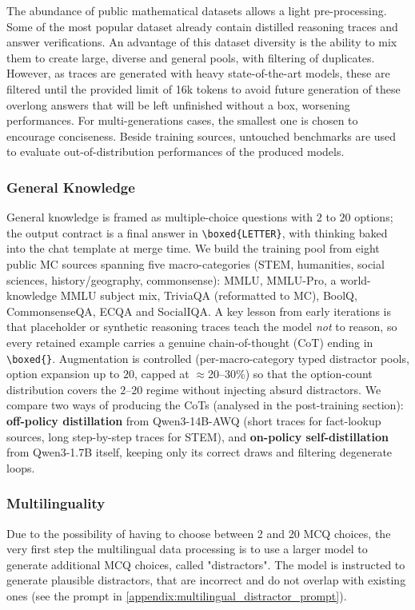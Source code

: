 \documentclass[11pt]{article}
\begin{document}
    The abundance of public mathematical datasets allows a light pre-processing. Some of the most popular dataset already contain distilled reasoning traces and answer verifications. An advantage of this dataset diversity is the ability to mix them to create large, diverse and general pools, with filtering of duplicates. However, as traces are generated with heavy state-of-the-art models, these are filtered until the provided limit of 16k tokens to avoid future generation of these overlong answers that will be left unfinished without a box, worsening performances. For multi-generations cases, the smallest one is chosen to encourage conciseness. Beside training sources, untouched benchmarks are used to evaluate out-of-distribution performances of the produced models. 

    
\subsubsection{General Knowledge}

    General knowledge is framed as multiple-choice questions with $2$ to $20$ options; the output contract is a final answer in \texttt{\textbackslash boxed\{LETTER\}}, with thinking baked into the chat template at merge time. We build the training pool from eight public MC sources spanning five macro-categories (STEM, humanities, social sciences, history/geography, commonsense): MMLU, MMLU-Pro, a world-knowledge MMLU subject mix, TriviaQA (reformatted to MC), BoolQ, CommonsenseQA, ECQA and SocialIQA. A key lesson from early iterations is that placeholder or synthetic reasoning traces teach the model \emph{not} to reason, so every retained example carries a genuine chain-of-thought (CoT) ending in \texttt{\textbackslash boxed\{\}}. Augmentation is controlled (per-macro-category typed distractor pools, option expansion up to $20$, capped at $\approx$20--30\%) so that the option-count distribution covers the $2$--$20$ regime without injecting absurd distractors. We compare two ways of producing the CoTs (analysed in the post-training section): \textbf{off-policy distillation} from Qwen3-14B-AWQ (short traces for fact-lookup sources, long step-by-step traces for STEM), and \textbf{on-policy self-distillation} from Qwen3-1.7B itself, keeping only its correct draws and filtering degenerate loops.


\subsubsection{Multilinguality}
Due to the possibility of having to choose between 2 and 20 MCQ choices, the very first step the multilingual data processing is to use a larger model to generate additional MCQ choices, called "distractors". The model is instructed to generate plausible distractors, that are incorrect and do not overlap with existing ones (see the prompt in \cref{appendix:multilingual_distractor_prompt}). 
\end{document}
